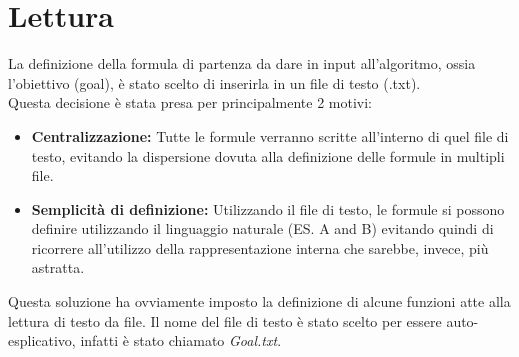 \documentclass[\main/tesi.tex]{subfiles}
\begin{document}
\section{Lettura}
La definizione della formula di partenza da dare in input all'algoritmo, ossia l'obiettivo (goal), è stato scelto di inserirla in un file di testo (.txt). \\
Questa decisione è stata presa per principalmente 2 motivi:
\begin{itemize}
  \item \textbf{Centralizzazione:} Tutte le formule verranno scritte all'interno di quel file di testo, evitando la dispersione dovuta alla definizione delle formule in multipli file.
  \item \textbf{Semplicità di definizione:} Utilizzando il file di testo, le formule si possono definire utilizzando il linguaggio naturale (ES. A and B) evitando quindi di ricorrere all'utilizzo della rappresentazione interna che sarebbe, invece, più astratta.
\end{itemize}
Questa soluzione ha ovviamente imposto la definizione di alcune funzioni atte alla lettura di testo da file.
Il nome del file di testo è stato scelto per essere auto-esplicativo, infatti è stato chiamato \textit{Goal.txt}. \\
\end{document}
